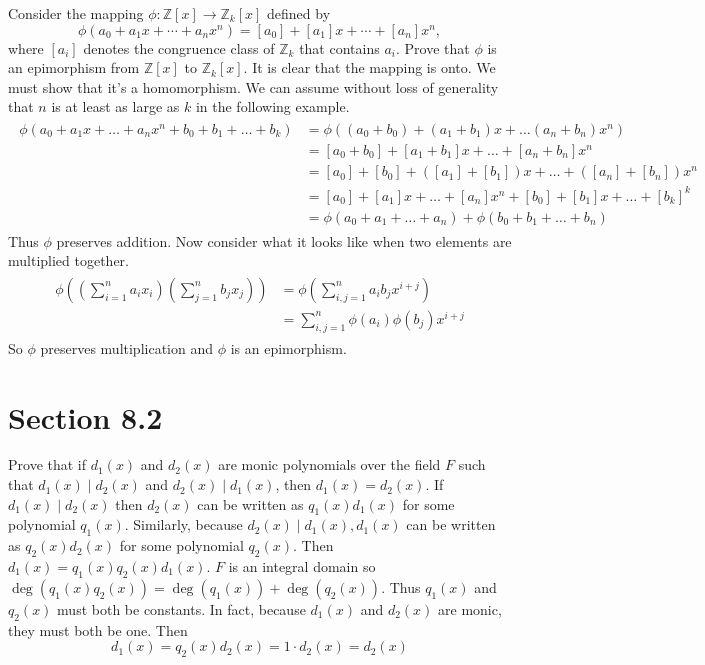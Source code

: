 \documentclass[paper=a4, fontsize=11pt]{jhwhw} %
\begin{document}
Consider the mapping $\phi: \mathbb Z[x] \to \mathbb Z_k[x]$ defined by 
$$\phi(a_0 + a_1x + \cdots + a_nx^n) = [a_0] + [a_1]x + \cdots + [a_n]x^n,$$
where $[a_i]$ denotes the congruence class of $\mathbb Z_k$ that contains $a_i$. Prove that $\phi$ is an epimorphism from $\mathbb Z[x]$ to $\mathbb Z_k[x]$.
\solution
It is clear that the mapping is onto. We must show that it's a homomorphism. We can assume without loss of generality that $n$ is at least as large as $k$ in the following example.
\begin{align}
    \begin{split}
        \phi(a_0 + a_1x + \ldots + a_nx^n + b_0 + b_1 + \ldots + b_k) &= \phi((a_0+b_0) + (a_1+b_1)x + \ldots (a_n + b_n)x^n)\\
        &= [a_0 + b_0] + [a_1 + b_1]x + \ldots + [a_n + b_n]x^n\\
        &= [a_0] + [b_0] + ([a_1] + [b_1])x + \ldots + ([a_n] + [b_n])x^n\\
        &= [a_0] + [a_1]x + \ldots + [a_n]x^n + [b_0] + [b_1]x + \ldots + [b_k]^k\\
        &= \phi(a_0 + a_1 + \ldots + a_n) + \phi(b_0 + b_1 + \ldots + b_n)
    \end{split}
\end{align}
Thus $\phi$ preserves addition. Now consider what it looks like when two elements are multiplied together.
\begin{align}
    \begin{split}
        \phi((\sum\limits_{i=1}^{n}a_ix_i )(\sum\limits_{j=1}^{n}b_jx_j)) &= \phi(\sum\limits_{i,j=1}^{n}a_ib_jx^{i+j})\\
                                                                          &= \sum\limits_{i,j=1}^{n}\phi(a_i)\phi(b_j)x^{i+j}
    \end{split}
\end{align}
So $\phi$ preserves multiplication and $\phi$ is an epimorphism. 

\newpage
\section*{Section 8.2}
Prove that if $d_1(x)$ and $d_2(x)$ are monic polynomials over the field $F$ such that $d_1(x)\mid d_2(x)$ and $d_2(x)\mid d_1(x)$, then $d_1(x) = d_2(x)$.  
\solution
If $d_1(x)\mid d_2(x)$ then $d_2(x)$ can be written as $q_1(x)d_1(x)$ for some polynomial $q_1(x)$. Similarly, because $d_2(x)\mid d_1(x), d_1(x)$ can be written as $q_2(x)d_2(x)$ for some polynomial $q_2(x)$. Then $d_1(x) = q_1(x)q_2(x)d_1(x)$. $F$ is an integral domain so $\deg(q_1(x)q_2(x)) = \deg(q_1(x)) + \deg(q_2(x))$. Thus $q_1(x)$ and $q_2(x)$ must both be constants. In fact, because $d_1(x)$ and $d_2(x)$ are monic, they must both be one. Then
$$d_1(x) = q_2(x)d_2(x) = 1\cdot d_2(x) = d_2(x)$$
\end{document}
